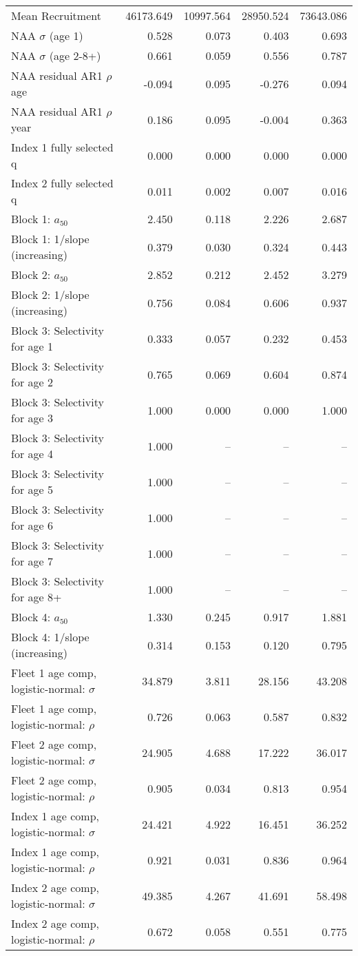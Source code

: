 \documentclass[
]{article}
\begin{document}
\begin{landscape}
\begin{longtable}[t]{lrrrr}
\endfoot
\bottomrule
\endlastfoot
Mean Recruitment & 46173.649 & 10997.564 & 28950.524 & 73643.086\\
NAA $\sigma$ (age 1) & 0.528 & 0.073 & 0.403 & 0.693\\
NAA $\sigma$ (age 2-8+) & 0.661 & 0.059 & 0.556 & 0.787\\
NAA residual AR1 $\rho$ age & -0.094 & 0.095 & -0.276 & 0.094\\
NAA residual AR1 $\rho$ year & 0.186 & 0.095 & -0.004 & 0.363\\
\addlinespace
Index 1 fully selected q & 0.000 & 0.000 & 0.000 & 0.000\\
Index 2 fully selected q & 0.011 & 0.002 & 0.007 & 0.016\\
Block 1: $a_{50}$ & 2.450 & 0.118 & 2.226 & 2.687\\
Block 1: 1/slope (increasing) & 0.379 & 0.030 & 0.324 & 0.443\\
Block 2: $a_{50}$ & 2.852 & 0.212 & 2.452 & 3.279\\
\addlinespace
Block 2: 1/slope (increasing) & 0.756 & 0.084 & 0.606 & 0.937\\
Block 3: Selectivity for age 1 & 0.333 & 0.057 & 0.232 & 0.453\\
Block 3: Selectivity for age 2 & 0.765 & 0.069 & 0.604 & 0.874\\
Block 3: Selectivity for age 3 & 1.000 & 0.000 & 0.000 & 1.000\\
Block 3: Selectivity for age 4 & 1.000 & -- & -- & --\\
\addlinespace
Block 3: Selectivity for age 5 & 1.000 & -- & -- & --\\
Block 3: Selectivity for age 6 & 1.000 & -- & -- & --\\
Block 3: Selectivity for age 7 & 1.000 & -- & -- & --\\
Block 3: Selectivity for age 8+ & 1.000 & -- & -- & --\\
Block 4: $a_{50}$ & 1.330 & 0.245 & 0.917 & 1.881\\
\addlinespace
Block 4: 1/slope (increasing) & 0.314 & 0.153 & 0.120 & 0.795\\
Fleet 1 age comp, logistic-normal: $\sigma$ & 34.879 & 3.811 & 28.156 & 43.208\\
Fleet 1 age comp, logistic-normal: $\rho$ & 0.726 & 0.063 & 0.587 & 0.832\\
Fleet 2 age comp, logistic-normal: $\sigma$ & 24.905 & 4.688 & 17.222 & 36.017\\
Fleet 2 age comp, logistic-normal: $\rho$ & 0.905 & 0.034 & 0.813 & 0.954\\
\addlinespace
Index 1 age comp, logistic-normal: $\sigma$ & 24.421 & 4.922 & 16.451 & 36.252\\
Index 1 age comp, logistic-normal: $\rho$ & 0.921 & 0.031 & 0.836 & 0.964\\
Index 2 age comp, logistic-normal: $\sigma$ & 49.385 & 4.267 & 41.691 & 58.498\\
Index 2 age comp, logistic-normal: $\rho$ & 0.672 & 0.058 & 0.551 & 0.775\\*
\end{longtable}
\end{landscape}
\end{document}
